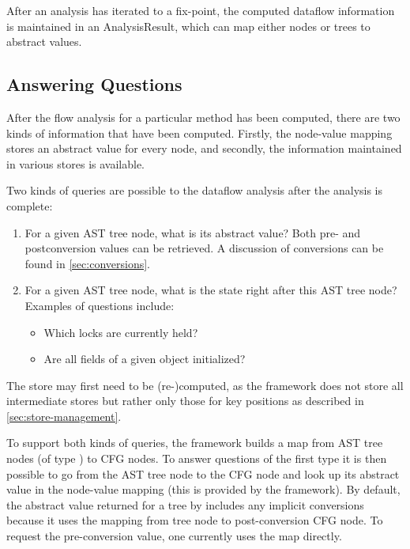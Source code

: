 After an analysis has iterated to a fix-point, the computed dataflow
information is maintained in an AnalysisResult, which can map either
nodes or trees to abstract values.


\subsection{Answering Questions}
\label{sec:answering-questions}
After the flow analysis for a particular method has been computed,
there are two kinds of information that have been computed.  Firstly,
the node-value mapping stores an abstract value for every node, and
secondly, the information maintained in various stores is available.

Two kinds of queries are possible to the dataflow analysis after the
analysis is complete:
\begin{enumerate}
    \item For a given AST tree node, what is its abstract value?  Both
      pre- and postconversion values can be retrieved.
      A discussion of conversions can be found in \autoref{sec:conversions}.
    \item For a given AST tree node, what is the state right after
      this AST tree node?  Examples of questions include:
    \begin{itemize}
        \item Which locks are currently held?
        \item Are all fields of a given object initialized?
    \end{itemize}
\end{enumerate}

The store may first need to be (re-)computed, as the framework does not
store all intermediate stores but rather only those for key positions
as described in \autoref{sec:store-management}.

To support both kinds of queries, the framework builds a map from AST
tree nodes (of type ) to CFG nodes.  To
answer questions of the first type it is then possible to go from the
AST tree node to the CFG node and look up its abstract value in the
node-value mapping (this is provided by the framework).  By default,
the abstract value returned for a tree by
 includes any implicit conversions
because it uses the mapping from tree node to post-conversion CFG
node.  To request the pre-conversion value, one currently uses the
 map directly.

